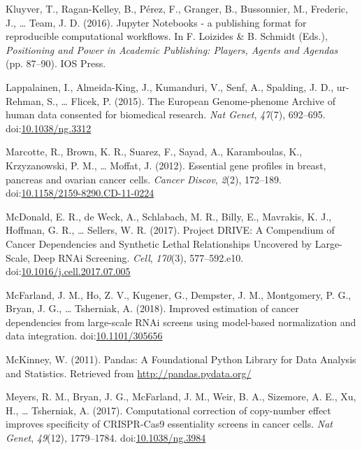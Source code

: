 \documentclass[man]{apa6}
\begin{document}
\hypertarget{ref-kluyver2016}{}
Kluyver, T., Ragan-Kelley, B., Pérez, F., Granger, B., Bussonnier, M.,
Frederic, J., \ldots{} Team, J. D. (2016). Jupyter Notebooks - a
publishing format for reproducible computational workflows. In F.
Loizides \& B. Schmidt (Eds.), \emph{Positioning and Power in Academic
Publishing: Players, Agents and Agendas} (pp. 87--90). IOS Press.

\hypertarget{ref-lappalainen2015}{}
Lappalainen, I., Almeida-King, J., Kumanduri, V., Senf, A., Spalding, J.
D., ur-Rehman, S., \ldots{} Flicek, P. (2015). The European
Genome-phenome Archive of human data consented for biomedical research.
\emph{Nat Genet}, \emph{47}(7), 692--695.
doi:\href{https://doi.org/10.1038/ng.3312}{10.1038/ng.3312}

\hypertarget{ref-marcotte2012}{}
Marcotte, R., Brown, K. R., Suarez, F., Sayad, A., Karamboulas, K.,
Krzyzanowski, P. M., \ldots{} Moffat, J. (2012). Essential gene profiles
in breast, pancreas and ovarian cancer cells. \emph{Cancer Discov},
\emph{2}(2), 172--189.
doi:\href{https://doi.org/10.1158/2159-8290.CD-11-0224}{10.1158/2159-8290.CD-11-0224}

\hypertarget{ref-mcdonald2017}{}
McDonald, E. R., de Weck, A., Schlabach, M. R., Billy, E., Mavrakis, K.
J., Hoffman, G. R., \ldots{} Sellers, W. R. (2017). Project DRIVE: A
Compendium of Cancer Dependencies and Synthetic Lethal Relationships
Uncovered by Large-Scale, Deep RNAi Screening. \emph{Cell},
\emph{170}(3), 577--592.e10.
doi:\href{https://doi.org/10.1016/j.cell.2017.07.005}{10.1016/j.cell.2017.07.005}

\hypertarget{ref-mcfarland2018}{}
McFarland, J. M., Ho, Z. V., Kugener, G., Dempster, J. M., Montgomery,
P. G., Bryan, J. G., \ldots{} Tsherniak, A. (2018). Improved estimation
of cancer dependencies from large-scale RNAi screens using model-based
normalization and data integration.
doi:\href{https://doi.org/10.1101/305656}{10.1101/305656}

\hypertarget{ref-mckinney2011}{}
McKinney, W. (2011). Pandas: A Foundational Python Library for Data
Analysis and Statistics. Retrieved from \url{http://pandas.pydata.org/}

\hypertarget{ref-meyers2017}{}
Meyers, R. M., Bryan, J. G., McFarland, J. M., Weir, B. A., Sizemore, A.
E., Xu, H., \ldots{} Tsherniak, A. (2017). Computational correction of
copy-number effect improves specificity of CRISPR-Cas9 essentiality
screens in cancer cells. \emph{Nat Genet}, \emph{49}(12), 1779--1784.
doi:\href{https://doi.org/10.1038/ng.3984}{10.1038/ng.3984}
\end{document}
